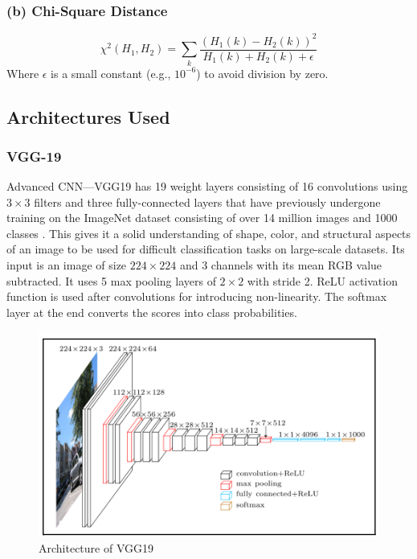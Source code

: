 \documentclass{ijclclp}
\begin{document}
\subsubsection*{(b) Chi-Square Distance}
\begin{equation}
\chi^2(H_1, H_2) = \sum_{k} \frac{ \left( H_1(k) - H_2(k) \right)^2 }{ H_1(k) + H_2(k) + \epsilon }
\label{eq:chi_square}
\end{equation}
Where \( \epsilon \) is a small constant (e.g., \( 10^{-6} \)) to avoid division by zero.
\vspace{1em}

\subsection{Architectures Used}
\vspace{1em}
\subsubsection{VGG-19}
Advanced CNN—VGG19 has 19 weight layers consisting of 16 convolutions using \(3 \times 3\) filters and three fully-connected layers that have previously undergone training on the ImageNet dataset consisting of over 14 million images and 1000 classes \cite{vggmedium}. This gives it a solid understanding of shape, color, and structural aspects of an image to be used for difficult classification tasks on large-scale datasets. Its input is an image of size \(224 \times 224\) and 3 channels with its mean RGB value subtracted. It uses 5 max pooling layers of \(2 \times 2\) with stride 2. ReLU activation function is used after convolutions for introducing non-linearity. The softmax layer at the end converts the scores into class probabilities.

\begin{figure}[ht]
    \centering
    \includegraphics[width=0.65\linewidth]{image5.png}
    \caption{Architecture of VGG19}
    \label{fig:vgg19-arch}
\end{figure}
\vspace{10cm}
\end{document}
